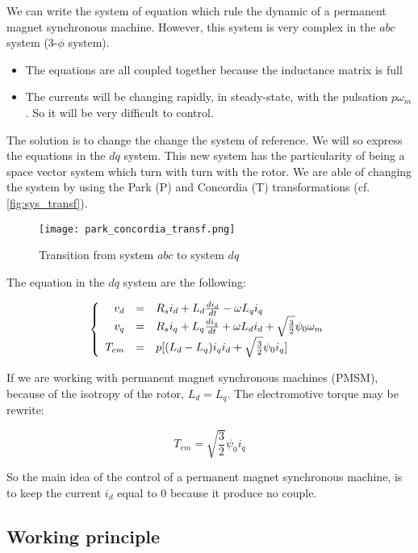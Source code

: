 We can write the system of equation which rule the dynamic of a permanent magnet synchronous machine. However, this system is very complex in the $abc$ system (3-$\phi$ system). 
\begin{itemize}
    \item The equations are all coupled together because the inductance matrix is full
    \item The currents will be changing rapidly, in steady-state, with the pulsation $p\omega_m$. So it will be very difficult to control.
\end{itemize}
The solution is to change the change the system of reference. We will so express the equations in the $dq$ system. This new system has the particularity of being a space vector system which turn with turn with the rotor. We are able of changing the system by using the Park (P) and Concordia (T) transformations (cf. \autoref{fig:sys_transf}).

\begin{figure}[H]
    \centering
    \texttt{[image: park\_concordia\_transf.png]}
    \caption{Transition from system $abc$ to system $dq$}
    \label{fig:sys_transf}
\end{figure}

The equation in the $dq$ system are the following:

\[
\left\{
\begin{array}{r c l}
     v_d &=& R_s i_d + L_d \frac{di_d}{dt} - \omega L_q i_q \\
     v_q &=& R_s i_q + L_q \frac{di_q}{dt} + \omega L_d i_d + \sqrt{\frac{3}{2}} \psi_0 \omega_m\\
     T_{em} &=& p[(L_d - L_q)i_q i_d + \sqrt{\frac{3}{2}} \psi_0 i_q]
\end{array}
\right.
\]

If we are working with permanent magnet synchronous machines (PMSM), because of the isotropy of the rotor, $L_d = L_q$. The electromotive torque may be rewrite:

\begin{equation}\label{eq:torque}
    T_{em} = \sqrt{\frac{3}{2}} \psi_0 i_q
\end{equation}

So the main idea of the control of a permanent magnet synchronous machine, is to keep the current $i_d$ equal to 0 because it produce no couple.

\subsection{Working principle}

